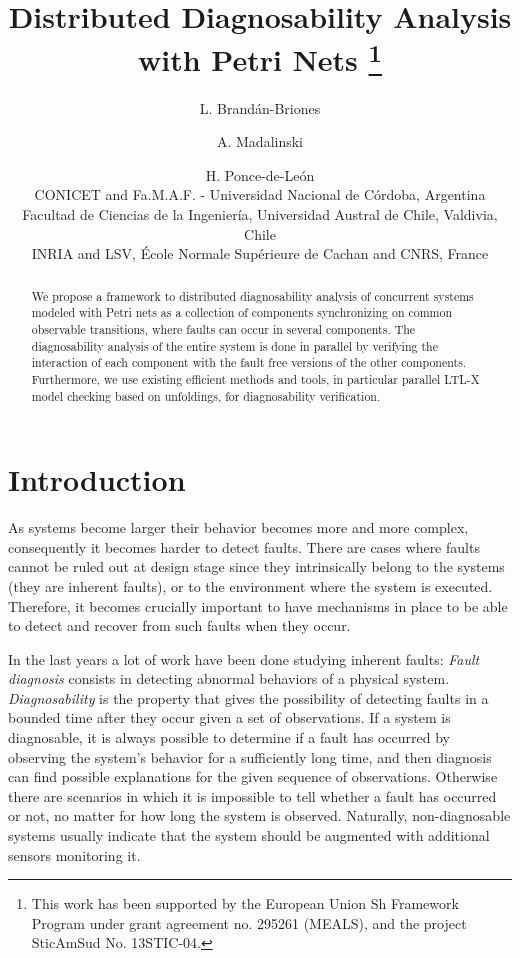 \documentclass[a4paper]{article}
\title{Distributed Diagnosability Analysis with Petri Nets
\thanks{This work has been supported by the European Union Sh Framework Program under grant agreement no. 295261 (MEALS), and
the project SticAmSud No. 13STIC-04.}}
\author {L. Brand\'an-Briones \and A. Madalinski \and H. Ponce-de-Le\'on\\
CONICET and Fa.M.A.F. - Universidad Nacional de C\'ordoba, Argentina\\
Facultad de Ciencias de la Ingenier\'ia, Universidad Austral de Chile, Valdivia, Chile\\
INRIA and LSV, \'Ecole Normale Sup\'erieure de Cachan and CNRS, France\\
}
\begin{document}
\maketitle


\begin{abstract}                We propose a framework to distributed diagnosability analysis of concurrent systems modeled with Petri nets as a collection of components synchronizing on common observable transitions, where faults can occur in several components. The diagnosability analysis of the entire system is done in parallel by verifying the interaction of each component with the fault free versions of the other components. Furthermore, we use existing efficient methods and tools, in particular parallel LTL-X model checking based on unfoldings, for diagnosability verification.





\end{abstract}





\section{Introduction}


As systems become larger their behavior becomes more and more complex, consequently it becomes harder to detect faults. There are cases where faults cannot be ruled out at design stage since they intrinsically belong to the systems (they are inherent faults), or to the environment where the system is executed. Therefore, it becomes crucially important to have mechanisms in place to be able to detect and recover from such faults when they occur.

In the last years a lot of work have been done studying inherent faults: \emph{Fault diagnosis} consists in detecting abnormal behaviors of a physical system. \emph{Diagnosability} is the property that gives the possibility of detecting faults in a bounded time after they occur given a set of observations. If a system is diagnosable, it is always possible to determine if a fault has occurred by observing the system's behavior for a sufficiently long time, and then diagnosis can find possible explanations for the given sequence of observations. Otherwise there are scenarios in which it is impossible to tell whether a fault has occurred or not, no matter for how long the system is observed. Naturally, non-diagnosable systems usually indicate that the system should be augmented with additional sensors monitoring it.
\end{document}
